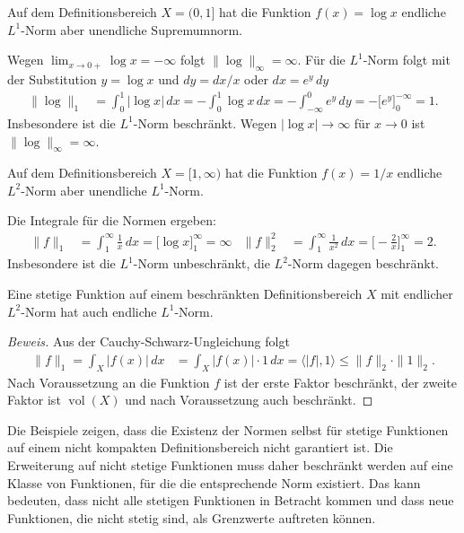 

\begin{beispiel}
Auf dem Definitionsbereich $X=(0,1]$ hat die Funktion
$f(x)=\log x$ endliche $L^1$-Norm aber unendliche Supremumnorm.

\medskip
\noindent
Wegen $\lim_{x\to 0+}\log x = -\infty$ folgt $\|\log\|_\infty=\infty$.
Für die $L^1$-Norm folgt mit der Substitution $y=\log x$ und
$dy = dx/x$ oder $dx = e^y\,dy$
\begin{align*}
\|\log\|_1
&=
\int_0^1|\log x|\,dx
=
-\int_0^1\log x\,dx
=
-\int_{-\infty}^0 e^y\,dy
=
-\biggl[ e^y \biggr]_0^{-\infty}
=
1.
\end{align*}
Insbesondere ist die $L^1$-Norm beschränkt.
Wegen $|\log x|\to\infty$ für $x\to 0$ ist $\|\log\|_\infty=\infty$.
\end{beispiel}

\begin{beispiel}
Auf dem Definitionsbereich $X=[1,\infty)$ hat die Funktion
$f(x)=1/x$ endliche $L^2$-Norm aber unendliche $L^1$-Norm.

\medskip
\noindent
Die Integrale für die Normen ergeben:
\begin{align*}
\|f\|_1
&=
\int_1^\infty \frac{1}{x}\,dx
=
\biggl[\log x\biggr]_1^\infty
=
\infty
&
\|f\|_2^2
&=
\int_1^\infty \frac{1}{x^2}\,dx
=
\biggl[-\frac{2}{x}\biggr]_1^\infty
=
2.
\end{align*}
Insbesondere ist die $L^1$-Norm unbeschränkt, die $L^2$-Norm dagegen
beschränkt.
\end{beispiel}

\begin{satz}
Eine stetige Funktion auf einem beschränkten Definitionsbereich $X$
mit endlicher $L^2$-Norm hat auch endliche $L^1$-Norm.
\end{satz}

\begin{proof}[Beweis]
Aus der Cauchy-Schwarz-Ungleichung folgt
\begin{align*}
\|f\|_1
=
\int_X |f(x)|\,dx
&=
\int_X |f(x)|\cdot 1 \,dx
=
\langle |f|, 1\rangle
\le
\|f\|_2\cdot \|1\|_2.
\end{align*}
Nach Voraussetzung an die Funktion $f$ ist der erste Faktor beschränkt,
der zweite Faktor ist $\operatorname{vol}(X)$ und nach Voraussetzung
auch beschränkt.
\end{proof}

Die Beispiele zeigen, dass die Existenz der Normen selbst für stetige
Funktionen auf einem nicht kompakten Definitionsbereich nicht garantiert ist.
Die Erweiterung auf nicht stetige Funktionen muss daher beschränkt
werden auf eine Klasse von Funktionen, für die die entsprechende Norm
existiert.
Das kann bedeuten, dass nicht alle stetigen Funktionen in Betracht 
kommen und dass neue Funktionen, die nicht stetig sind, als
Grenzwerte auftreten können.

